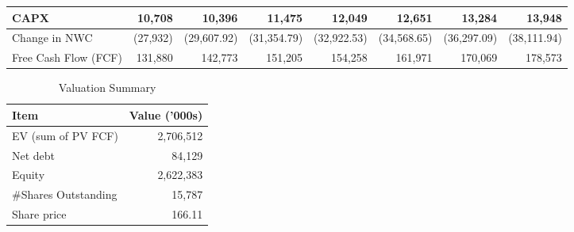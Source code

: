 \begin{table}[ht]
\begin{tabular}{|l|r|r|r|r|r|r|r|}
    CAPX                      & 10,708            & 10,396            & 11,475            & 12,049            & 12,651            & 13,284            & 13,948            \\ \hline
    Change in NWC             & (27,932)          & (29,607.92)       & (31,354.79)       & (32,922.53)       & (34,568.65)       & (36,297.09)       & (38,111.94)       \\ \hline
    Free Cash Flow (FCF)      & 131,880           & 142,773           & 151,205           & 154,258           & 161,971           & 170,069           & 178,573           \\ \hline
    \end{tabular}
    \normalsize %
    \end{table}

    \begin{table}[ht]
        \centering
        \caption{Valuation Summary}
        \label{table:valuation_summary}
        \begin{tabular}{|l|r|}
        \hline
        \textbf{Item}                 & \textbf{Value} ('000s)    \\
        \hline
        EV (sum of PV FCF)            & 2,706,512         \\
        \hline
        Net debt                      & 84,129            \\
        \hline
        Equity                        & 2,622,383         \\
        \hline
        \#Shares Outstanding          & 15,787            \\
        \hline
        Share price                   & 166.11            \\
        \hline
        \end{tabular}
    \end{table}
        

